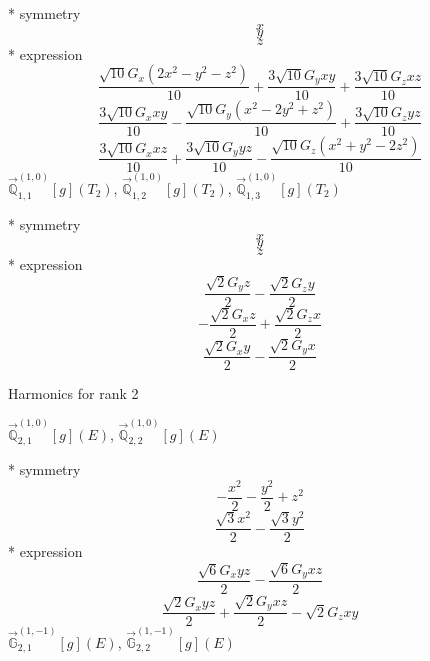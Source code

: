 \documentclass[fleqn,8pt]{jsarticle}
\begin{document}
\noindent\quad ** symmetry
\begin{dmath*}
x
\end{dmath*}
\begin{dmath*}
y
\end{dmath*}
\begin{dmath*}
z
\end{dmath*}
\noindent\quad ** expression
\begin{dmath*}
\frac{\sqrt{10} G_{x} \left(2 x^{2} - y^{2} - z^{2}\right)}{10} + \frac{3 \sqrt{10} G_{y} x y}{10} + \frac{3 \sqrt{10} G_{z} x z}{10}
\end{dmath*}
\begin{dmath*}
\frac{3 \sqrt{10} G_{x} x y}{10} - \frac{\sqrt{10} G_{y} \left(x^{2} - 2 y^{2} + z^{2}\right)}{10} + \frac{3 \sqrt{10} G_{z} y z}{10}
\end{dmath*}
\begin{dmath*}
\frac{3 \sqrt{10} G_{x} x z}{10} + \frac{3 \sqrt{10} G_{y} y z}{10} - \frac{\sqrt{10} G_{z} \left(x^{2} + y^{2} - 2 z^{2}\right)}{10}
\end{dmath*}
\noindent\quad $\vec{\mathbb{Q}}_{1,1}^{(1,0)}[g](T_{2})$, $\vec{\mathbb{Q}}_{1,2}^{(1,0)}[g](T_{2})$, $\vec{\mathbb{Q}}_{1,3}^{(1,0)}[g](T_{2})$

\noindent\quad ** symmetry
\begin{dmath*}
x
\end{dmath*}
\begin{dmath*}
y
\end{dmath*}
\begin{dmath*}
z
\end{dmath*}
\noindent\quad ** expression
\begin{dmath*}
\frac{\sqrt{2} G_{y} z}{2} - \frac{\sqrt{2} G_{z} y}{2}
\end{dmath*}
\begin{dmath*}
- \frac{\sqrt{2} G_{x} z}{2} + \frac{\sqrt{2} G_{z} x}{2}
\end{dmath*}
\begin{dmath*}
\frac{\sqrt{2} G_{x} y}{2} - \frac{\sqrt{2} G_{y} x}{2}
\end{dmath*}

\noindent * Harmonics for rank 2

\noindent\quad $\vec{\mathbb{Q}}_{2,1}^{(1,0)}[g](E)$, $\vec{\mathbb{Q}}_{2,2}^{(1,0)}[g](E)$

\noindent\quad ** symmetry
\begin{dmath*}
- \frac{x^{2}}{2} - \frac{y^{2}}{2} + z^{2}
\end{dmath*}
\begin{dmath*}
\frac{\sqrt{3} x^{2}}{2} - \frac{\sqrt{3} y^{2}}{2}
\end{dmath*}
\noindent\quad ** expression
\begin{dmath*}
\frac{\sqrt{6} G_{x} y z}{2} - \frac{\sqrt{6} G_{y} x z}{2}
\end{dmath*}
\begin{dmath*}
\frac{\sqrt{2} G_{x} y z}{2} + \frac{\sqrt{2} G_{y} x z}{2} - \sqrt{2} G_{z} x y
\end{dmath*}
\noindent\quad $\vec{\mathbb{G}}_{2,1}^{(1,-1)}[g](E)$, $\vec{\mathbb{G}}_{2,2}^{(1,-1)}[g](E)$
\end{document}
